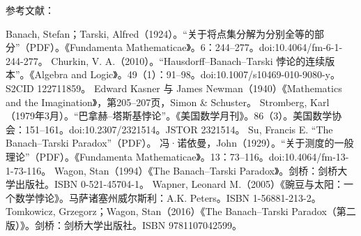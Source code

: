 参考文献：

Banach, Stefan；Tarski, Alfred（1924）。“关于将点集分解为分别全等的部分”（PDF）。《Fundamenta Mathematicae》。6：244–277。doi:10.4064/fm-6-1-244-277。  
Churkin, V. A.（2010）。“Hausdorff–Banach–Tarski 悖论的连续版本”。《Algebra and Logic》。49（1）：91–98。doi:10.1007/s10469-010-9080-y。S2CID 122711859。  
Edward Kasner 与 James Newman（1940）《Mathematics and the Imagination》，第205–207页，Simon & Schuster。  
Stromberg, Karl（1979年3月）。“巴拿赫–塔斯基悖论”。《美国数学月刊》。86（3）。美国数学协会：151–161。doi:10.2307/2321514。JSTOR 2321514。  
Su, Francis E. “The Banach–Tarski Paradox”（PDF）。  
冯·诺依曼，John（1929）。“关于测度的一般理论”（PDF）。《Fundamenta Mathematicae》。13：73–116。doi:10.4064/fm-13-1-73-116。  
Wagon, Stan（1994）《The Banach–Tarski Paradox》。剑桥：剑桥大学出版社。ISBN 0-521-45704-1。  
Wapner, Leonard M.（2005）《豌豆与太阳：一个数学悖论》。马萨诸塞州威尔斯利：A.K. Peters。ISBN 1-56881-213-2。  
Tomkowicz, Grzegorz；Wagon, Stan（2016）《The Banach–Tarski Paradox（第二版）》。剑桥：剑桥大学出版社。ISBN 9781107042599。

 

